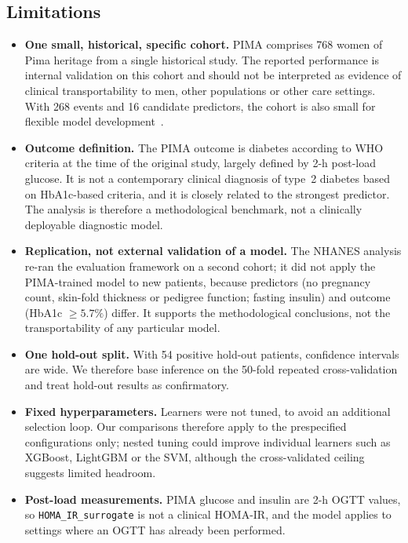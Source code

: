 \documentclass[preprint,12pt,authoryear=false]{elsarticle}
\begin{document}
\subsection{Limitations}
\begin{itemize}
  \item \textbf{One small, historical, specific cohort.} PIMA comprises 768 women of Pima heritage from a single historical study. The reported performance is internal validation on this cohort and should not be interpreted as evidence of clinical transportability to men, other populations or other care settings. With 268 events and 16 candidate predictors, the cohort is also small for flexible model development~\cite{riley2020samplesize}.
  \item \textbf{Outcome definition.} The PIMA outcome is diabetes according to WHO criteria at the time of the original study, largely defined by 2-h post-load glucose. It is not a contemporary clinical diagnosis of type~2 diabetes based on HbA1c-based criteria, and it is closely related to the strongest predictor. The analysis is therefore a methodological benchmark, not a clinically deployable diagnostic model.
  \item \textbf{Replication, not external validation of a model.} The NHANES analysis re-ran the evaluation framework on a second cohort; it did not apply the PIMA-trained model to new patients, because predictors (no pregnancy count, skin-fold thickness or pedigree function; fasting insulin) and outcome (HbA1c $\geq 5.7\%$) differ. It supports the methodological conclusions, not the transportability of any particular model.
  \item \textbf{One hold-out split.} With 54 positive hold-out patients, confidence intervals are wide. We therefore base inference on the 50-fold repeated cross-validation and treat hold-out results as confirmatory.
  \item \textbf{Fixed hyperparameters.} Learners were not tuned, to avoid an additional selection loop. Our comparisons therefore apply to the prespecified configurations only; nested tuning could improve individual learners such as XGBoost, LightGBM or the SVM, although the cross-validated ceiling suggests limited headroom.
  \item \textbf{Post-load measurements.} PIMA glucose and insulin are 2-h OGTT values, so \texttt{HOMA\_IR\_surrogate} is not a clinical HOMA-IR, and the model applies to settings where an OGTT has already been performed.
\end{itemize}
\end{document}

